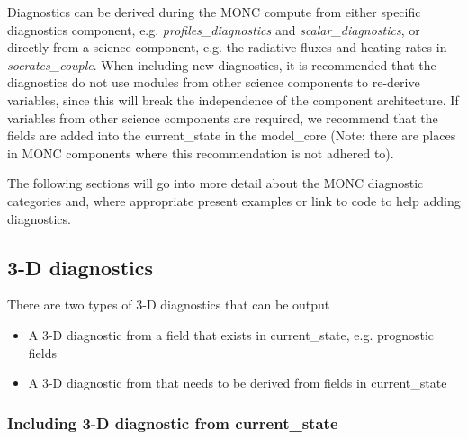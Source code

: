 \documentclass[a4paper,11pt]{article}
\begin{document}
Diagnostics can be derived during the MONC compute from either specific
diagnostics component, e.g. \emph{profiles\_diagnostics} and
\emph{scalar\_diagnostics}, or directly from a science component, e.g. the
radiative fluxes and heating rates in \emph{socrates\_couple}. When including
new diagnostics, it is recommended that the diagnostics do not use modules from
other science components to re-derive variables, since this will break the
independence of the component architecture. If variables from other science
components are required, we recommend that the fields are added into the
current\_state in the model\_core (Note: there are places in MONC components
where this recommendation is not adhered to).

The following sections will go into more detail about the MONC diagnostic
categories and, where appropriate present examples or link to code to help adding
diagnostics.

\subsection{3-D diagnostics}

There are two types of 3-D diagnostics that can be output

\begin{itemize}
  \item {A 3-D diagnostic from a field that exists in current\_state, e.g.
  prognostic fields}
  \item {A 3-D diagnostic from that needs to be derived from fields in current\_state}
\end{itemize}

\subsubsection{Including 3-D diagnostic from current\_state}
\end{document}
